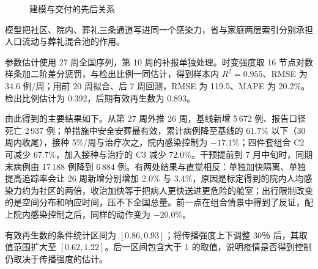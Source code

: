 \begin{figure}[htbp]
\centering
{}
\caption{建模与交付的先后关系}
\label{fig:workflow}
\end{figure}

模型把社区、院内、葬礼三条通道写进同一个感染力，省与家庭两层索引分别承担人口流动与葬礼混合池的作用。

参数估计使用 27 周全国序列，第 10 周的补报单独处理。时变强度取 16 节点对数样条加二阶差分惩罚，与检出比例一同估计，得到样本内 $R^2=0.955$、RMSE 为 34.6 例/周；用前 20 周拟合、后 7 周回测，RMSE 为 119.5、MAPE 为 20.2\%。检出比例估计为 0.392，后期有效再生数为 0.893。

由此得到的主要结果如下。从第 27 周外推 26 周，基线新增 5\,672 例、报告口径死亡 2\,937 例；单措施中安全安葬最有效，累计病例降至基线的 $61.7\%$ 以下（30 周内收尾），接种 5\%/周与治疗次之，院内感染控制为 $-17.1\%$；四件套组合 C2 可减少 $67.7\%$，加入接种与治疗的 C3 减少 $72.0\%$。干预提前到 7 月中旬时，同期末病例由 17\,188 例降到 6\,884 例。有两处结果与直觉相反：单独加快隔离、单独提高追踪率会让 26 周新增分别增加 2.0\% 与 3.4\%，原因是标定得到的院内人均感染力约为社区的两倍，收治加快等于把病人更快送进更危险的舱室；出行限制改变的是空间分布和响应时间，压不下全国总量。前一点在组合情景中得到了反证，配上院内感染控制之后，同样的动作变为 $-20.0\%$。

有效再生数的条件统计区间为 $[0.86,0.93]$；将传播强度上下调整 $30％$ 后，其取值范围扩大至 $[0.62,1.22]$。后一区间包含大于 1 的取值，说明疫情是否得到控制仍取决于传播强度的估计。
